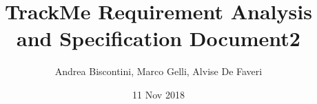 
\usepackage[english]{babel}
\usepackage{natbib}
\usepackage{url}

\title{TrackMe Requirement Analysis and Specification Document}								%
\author{Andrea Biscontini, Marco Gelli, Alvise De Faveri}								%
\date{11 Nov 2018}											%

\makeatletter
\let\thetitle\@title
\let\theauthor\@author
\let\thedate\@date
\makeatother

\pagestyle{fancy}
\fancyhf{}
\rhead{\theauthor}
\lhead{\thetitle}
\cfoot{\thepage}




\title{2} %


